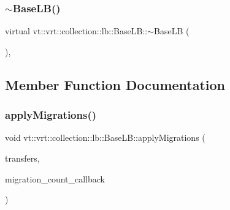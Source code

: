 \mbox{\label{structvt_1_1vrt_1_1collection_1_1lb_1_1_base_l_b_a2d4e31b7ae227886a24443334114269e}} 
\subsubsection{\texorpdfstring{$\sim$\+Base\+L\+B()}{~BaseLB()}}
{\footnotesize\ttfamily virtual vt\+::vrt\+::collection\+::lb\+::\+Base\+L\+B\+::$\sim$\+Base\+LB (\begin{DoxyParamCaption}{ }\end{DoxyParamCaption})\hspace{0.3cm}{\ttfamily [virtual]}, {\ttfamily [default]}}



\subsection{Member Function Documentation}
\mbox{\label{structvt_1_1vrt_1_1collection_1_1lb_1_1_base_l_b_aa19210106d6f44ea03b446c7f6a92cb1}} 
\subsubsection{\texorpdfstring{apply\+Migrations()}{applyMigrations()}}
{\footnotesize\ttfamily void vt\+::vrt\+::collection\+::lb\+::\+Base\+L\+B\+::apply\+Migrations (\begin{DoxyParamCaption}\item[{\hyperlink{structvt_1_1vrt_1_1collection_1_1lb_1_1_base_l_b_a329e8179ec41a1bd4924c79fe23a79af}{Transfer\+Vec\+Type} const \&}]{transfers,  }\item[{\hyperlink{structvt_1_1vrt_1_1collection_1_1lb_1_1_base_l_b_aba7198eb30aef1b19c1f1efdea760543}{Migration\+Count\+CB}}]{migration\+\_\+count\+\_\+callback }\end{DoxyParamCaption})}

